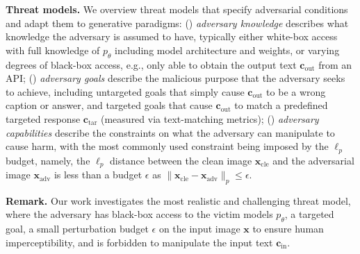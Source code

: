 \textbf{Threat models.} We overview threat models that specify adversarial conditions~\citep{carlini2019evaluating} and adapt them to generative paradigms: () \emph{adversary knowledge} describes  what knowledge the adversary is assumed to have, typically either white-box access with full knowledge of $p_{\theta}$ including model architecture and weights, or varying degrees of black-box access, e.g., only able to obtain the output text $\boldsymbol{c}_{\text{out}}$ from an API; () \emph{adversary goals} describe the malicious purpose that the adversary seeks to achieve, including untargeted goals that simply cause $\boldsymbol{c}_{\text{out}}$ to be a wrong caption or answer, and targeted goals that cause $\boldsymbol{c}_{\text{out}}$ to match a predefined targeted response $\boldsymbol{c}_{\text{tar}}$ (measured via text-matching metrics); () \emph{adversary capabilities} describe the constraints on what the adversary can manipulate to cause harm, with the most commonly used constraint being imposed by the $\ell_{p}$ budget, namely, the $\ell_{p}$ distance between the clean image $\boldsymbol{x}_{\text{cle}}$ and the adversarial image $\boldsymbol{x}_{\text{adv}}$ is less than a budget $\epsilon$ as $\|\boldsymbol{x}_{\text{cle}}-\boldsymbol{x}_{\text{adv}}\|_{p}\leq \epsilon$.

\textbf{Remark.} Our work investigates the most realistic and challenging threat model, where the adversary has black-box access to the victim models $p_{\theta}$, a targeted goal, a small perturbation budget $\epsilon$ on the input image $\boldsymbol{x}$ to ensure human imperceptibility, and is forbidden to manipulate the input text $\boldsymbol{c}_{\text{in}}$.

